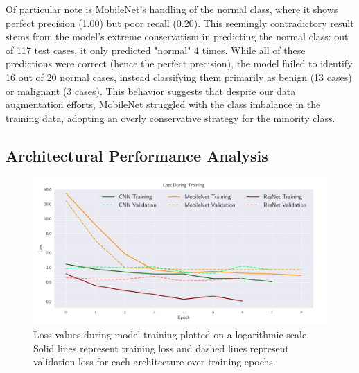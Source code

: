Of particular note is MobileNet's handling of the normal class, where it shows perfect precision (1.00) but poor recall (0.20). This seemingly contradictory result stems from the model's extreme conservatism in predicting the normal class: out of 117 test cases, it only predicted "normal" 4 times. While all of these predictions were correct (hence the perfect precision), the model failed to identify 16 out of 20 normal cases, instead classifying them primarily as benign (13 cases) or malignant (3 cases). This behavior suggests that despite our data augmentation efforts, MobileNet struggled with the class imbalance in the training data, adopting an overly conservative strategy for the minority class.

\onecolumngrid
\subsection{Architectural Performance Analysis }

\begin{figure}[h!]
    \begin{minipage}{\textwidth}
        \centering
        \includegraphics[width = \textwidth]{../figs/cnn_loss.pdf}
        \caption{Loss values during model training plotted on a logarithmic scale. Solid lines represent training loss and dashed lines represent validation loss for each architecture over training epochs.}
        \label{fig:loss_curves}
    \end{minipage}
\end{figure}

